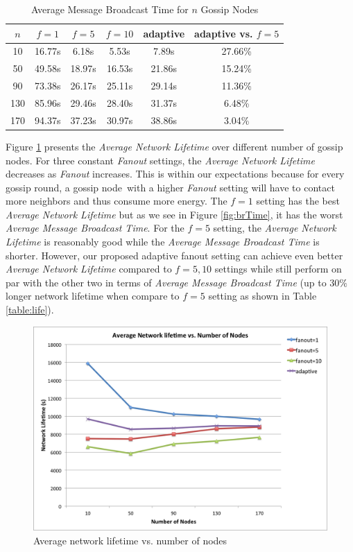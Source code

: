 \documentclass[onehalf,11pt]{beavtex}
\newcommand{\gn}{gossip node}
\newcommand{\gns}{gossip nodes}
\newcommand{\ambt}{Average Message Broadcast Time}
\newcommand{\anl}{Average Network Lifetime}
\begin{document}
\begin{table}[h]
	\centering
	\caption{Average Message Broadcast Time for $n$ Gossip Nodes}
	\label{table:brTime}
	\begin{tabular}{|c|c|c|c|c|c|}
		\hline 
		$n$	& $f=1$ & $f=5$ & $f=10$ & adaptive & adaptive vs. $f=5$\\ 
		\hline 
		10 & 16.77s & 6.18s & 5.53s & 7.89s & 27.66\%\\ 
		\hline 
		50 & 49.58s & 18.97s & 16.53s & 21.86s & 15.24\%\\ 
		\hline 
		90 & 73.38s & 26.17s & 25.11s & 29.14s & 11.36\%\\ 
		\hline 
		130 & 85.96s & 29.46s & 28.40s & 31.37s & 6.48\%\\ 
		\hline 
		170 & 94.37s & 37.23s & 30.97s & 38.86s & 3.04\%\\ 
		\hline 
	\end{tabular} 
\end{table}

Figure \ref{fig:life} presents the \emph{Average Network Lifetime} over different number of \gns. For three constant \emph{Fanout} settings, the \emph{\anl} decreases as \emph{Fanout} increases. This is within our expectations because for every gossip round, a \gn ~with a higher \emph{Fanout} setting will have to contact more neighbors and thus consume more energy. The $f=1$ setting has the best \emph{\anl} but as we see in Figure \ref{fig:brTime}, it has the worst \emph{\ambt}. For the $f=5$ setting, the \emph{\anl} is reasonably good while the \emph{\ambt} is shorter. However, our proposed adaptive fanout setting can achieve even better \emph{\anl} compared to $f=5,10$ settings while still perform on par with the other two in terms of \emph{\ambt} (up to $30\%$ longer network lifetime when compare to $f=5$ setting as shown in Table \ref{table:life}). 

\begin{figure} 
	\centering
	\includegraphics[width=5.5in]{life.png}
	\caption{Average network lifetime vs. number of nodes}
	\label{fig:life}
\end{figure}
\end{document}
